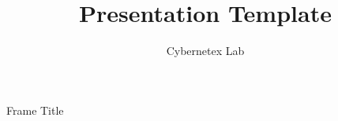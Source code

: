 \documentclass{beamer}
\title{Presentation Template}
\author{Cybernetex Lab}
\begin{document}
\begin{frame}[plain]
    \maketitle
\end{frame}
\begin{frame}{Frame Title}
\end{frame}
\end{document}

